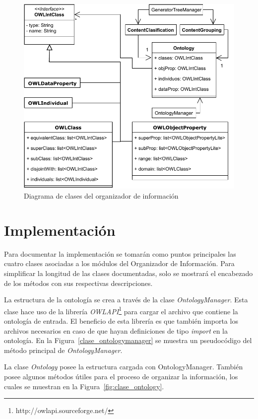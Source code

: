 \begin{figure}
    \centering
    \includegraphics{img/organizacion_informacion/clases_organizador_informacion.pdf}
    \caption{Diagrama de clases del organizador de información}
    \label{fig:diagrama_clases_organizador}
\end{figure}

\section{Implementación}
Para documentar la implementación se tomarán como puntos principales las cuatro clases asociadas a los módulos del Organizador de Información. Para simplificar la longitud de las clases documentadas, solo se mostrará el encabezado de los métodos con sus respectivas descripciones.

La estructura de la ontología se crea a través de la clase \emph{OntologyManager}. Esta clase hace uso de la librería  \emph{OWLAPI}\footnote{http://owlapi.sourceforge.net/} para cargar el archivo que contiene la ontología de entrada. El beneficio de esta librería es que también importa los archivos necesarios en caso de que hayan definiciones de tipo \emph{import} en la ontología. En la Figura~\ref{clase_ontologymanager} se muestra un pseudocódigo del método principal de \emph{OntologyManager}.

La clase \emph{Ontology} posee la estructura cargada con OntologyManager. También posee algunos métodos útiles para el proceso de organizar la información, los cuales se muestran en la Figura~\ref{fig:clase_ontology}.

